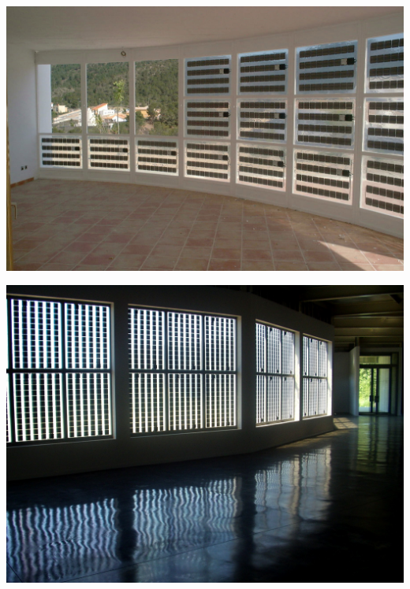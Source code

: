 \documentclass[xcolor={usenames,svgnames,dvipsnames}]{beamer}
\begin{document}
\begin{frame}[label=sec-3-0-6]{}
\includegraphics[width=.9\linewidth]{../figs/TorreguilInterior2.jpg}
\end{frame}

\begin{frame}[label=sec-3-0-7]{}
\includegraphics[width=.9\linewidth]{../figs/VistadesdeInterior.jpg}
\end{frame}
\end{document}
